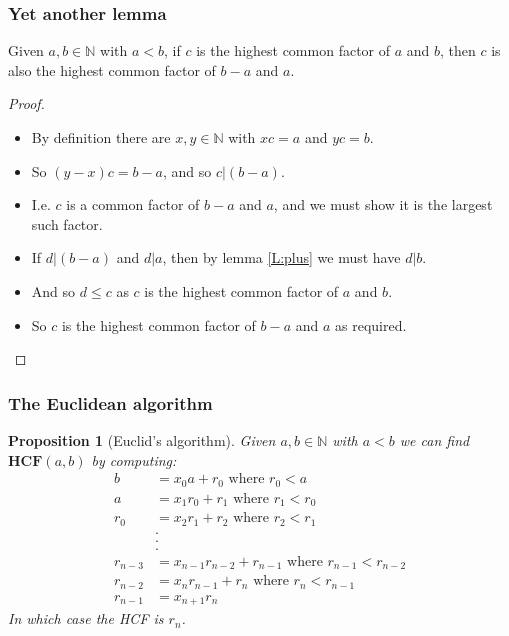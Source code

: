 \documentclass[handout]{beamer}
\newcommand{\bN}{\mathbb{N}}
\newcommand{\HCF}{\mathbf{HCF}}
\newtheorem{proposition}[theorem]{Proposition}{\bfseries}{\itshape}
\begin{document}
\begin{frame}
\frametitle{Yet another lemma}
\begin{lemma}\label{L:euclid}
Given $a,b\in\bN$ with $a<b$, if $c$ is the highest common factor of $a$ and $b$, then $c$ is also the highest common factor of $b-a$ and $a$.
\end{lemma}
\begin{proof}
\begin{itemize}
\item By definition there are $x,y\in\bN$ with $xc = a$ and $yc= b$. 
\item So $(y-x)c = b - a$, and so $c|(b-a)$. 
\item I.e. $c$ is a common factor of $b-a$ and $a$, and we must show it is the largest such factor. 
\item If $d|(b-a)$ and $d|a$, then by lemma \ref{L:plus} we must have $d|b$. 
\item And so $d\leq c$ as $c$ is the highest common factor of $a$ and $b$. 
\item So $c$ is the highest common factor of $b-a$ and $a$ as required.
\end{itemize}
\end{proof}
\end{frame}

\begin{frame}
\frametitle{The Euclidean algorithm}
\begin{proposition}[Euclid's algorithm]
Given $a,b\in\bN$ with $a< b$ we can find $\HCF(a,b)$ by computing:
\begin{align*}
b &= x_0 a + r_0 \text{ where $r_0< a$} \\
a &= x_1 r_0 + r_1 \text{ where $r_1< r_0$} \\
r_0&=x_2 r_1 + r_2 \text{ where $r_2< r_1$}\\
&.\\
&.\\
&.\\
r_{n-3} &= x_{n-1}r_{n-2} + r_{n-1}\text{ where $r_{n-1}< r_{n-2}$}\\
r_{n-2}&= x_{n} r_{n-1} + r_n \text{ where $r_n< r_{n-1}$} \\
r_{n-1}&= x_{n+1} r_n
\end{align*}
In which case the HCF is $r_n$.
\end{proposition}
\end{frame}
\end{document}
